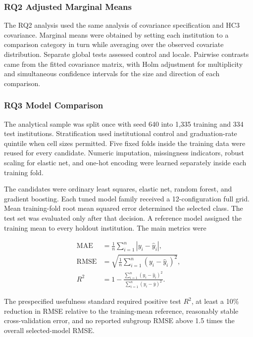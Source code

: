 \documentclass[12pt,a4paper]{article}
\newcommand{\Rtwo}{\ensuremath{R^{2}}}
\begin{document}
\subsubsection{RQ2 Adjusted Marginal Means}

The RQ2 analysis used the same analysis of covariance specification and HC3 covariance. Marginal means were obtained by setting each institution to a comparison category in turn while averaging over the observed covariate distribution. Separate global tests assessed control and locale. Pairwise contrasts came from the fitted covariance matrix, with Holm adjustment for multiplicity and simultaneous confidence intervals for the size and direction of each comparison.

\subsubsection{RQ3 Model Comparison}

The analytical sample was split once with seed 640 into 1,335 training and 334 test institutions. Stratification used institutional control and graduation-rate quintile when cell sizes permitted. Five fixed folds inside the training data were reused for every candidate. Numeric imputation, missingness indicators, robust scaling for elastic net, and one-hot encoding were learned separately inside each training fold.

The candidates were ordinary least squares, elastic net, random forest, and gradient boosting. Each tuned model family received a 12-configuration full grid. Mean training-fold root mean squared error determined the selected class. The test set was evaluated only after that decision. A reference model assigned the training mean to every holdout institution. The main metrics were

\begin{align}
\operatorname{MAE} &= \frac{1}{n}\sum_{i=1}^{n}|y_i-\hat y_i|,\\
\operatorname{RMSE} &= \sqrt{\frac{1}{n}\sum_{i=1}^{n}(y_i-\hat y_i)^2},\\
R^2 &= 1-\frac{\sum_{i=1}^{n}(y_i-\hat y_i)^2}{\sum_{i=1}^{n}(y_i-\bar y)^2}.
\end{align}

The prespecified usefulness standard required positive test \Rtwo, at least a 10\% reduction in RMSE relative to the training-mean reference, reasonably stable cross-validation error, and no reported subgroup RMSE above 1.5 times the overall selected-model RMSE.
\end{document}
